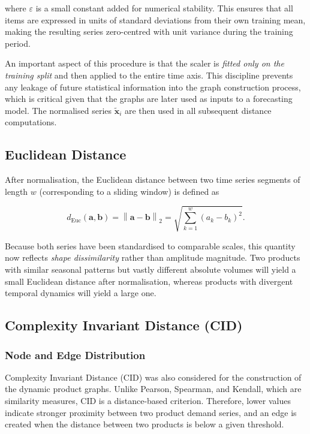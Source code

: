 where $\varepsilon$ is a small constant added for numerical stability. This ensures that all items are expressed in units of standard deviations from their own training mean, making the resulting series zero-centred with unit variance during the training period.

An important aspect of this procedure is that the scaler is \textit{fitted only on the training split} and then applied to the entire time axis. This discipline prevents any leakage of future statistical information into the graph construction process, which is critical given that the graphs are later used as inputs to a forecasting model. The normalised series $\tilde{\mathbf{x}}_i$ are then used in all subsequent distance computations.

\subsection{Euclidean Distance}

After normalisation, the Euclidean distance between two time series segments of length $w$ (corresponding to a sliding window) is defined as

\begin{equation}
    d_{\text{Euc}}(\mathbf{a}, \mathbf{b}) = \left\| \mathbf{a} - \mathbf{b} \right\|_2 = \sqrt{\sum_{k=1}^{w} \left(a_k - b_k\right)^2}.
\end{equation}

Because both series have been standardised to comparable scales, this quantity now reflects \textit{shape dissimilarity} rather than amplitude magnitude. Two products with similar seasonal patterns but vastly different absolute volumes will yield a small Euclidean distance after normalisation, whereas products with divergent temporal dynamics will yield a large one.


\subsection{Complexity Invariant Distance (CID)}
\label{subsec:cid_graphs}

\subsubsection{Node and Edge Distribution}
\label{subsubsec:cid_node_edge_distribution}

Complexity Invariant Distance (CID) was also considered for the construction of the dynamic product graphs. Unlike Pearson, Spearman, and Kendall, which are similarity measures, CID is a distance-based criterion. Therefore, lower values indicate stronger proximity between two product demand series, and an edge is created when the distance between two products is below a given threshold.

